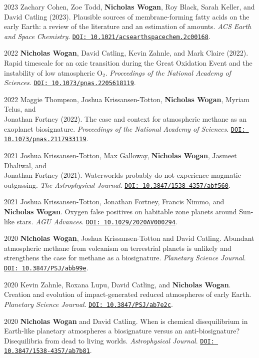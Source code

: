 \documentclass{article}
\begin{document}
\begin{cvlist}
\item[2023]
  Zachary Cohen, Zoe Todd, \textbf{Nicholas Wogan}, Roy Black, Sarah Keller, and David Catling (2023). Plausible sources of membrane-forming fatty acids on the early Earth: a review of the literature and an estimation of amounts. \emph{ACS Earth and Space Chemistry}. \href{https://doi.org/10.1021/acsearthspacechem.2c00168}{\nolinkurl{DOI: 10.1021/acsearthspacechem.2c00168}}.
\item[2022]
  \textbf{Nicholas Wogan}, David Catling, Kevin Zahnle, and Mark Claire (2022). Rapid timescale for an oxic transition during the Great Oxidation Event and the instability of low atmospheric O$_2$. \emph{Proceedings of the National Academy of Sciences}. \href{https://doi.org/10.1073/pnas.2205618119}{\nolinkurl{DOI: 10.1073/pnas.2205618119}}.
\item[2022]
  Maggie Thompson, Joshua Krissansen-Totton, \textbf{Nicholas Wogan}, Myriam Telus, and \\Jonathan Fortney (2022). The case and context for atmospheric methane as an exoplanet biosignature. \emph{Proceedings of the National Academy of Sciences}. \href{https://doi.org/10.1073/pnas.2117933119}{\nolinkurl{DOI: 10.1073/pnas.2117933119}}.
\item[2021]
  Joshua Krissansen-Totton, Max Galloway, \textbf{Nicholas Wogan}, Jasmeet Dhaliwal, and \\Jonathan Fortney (2021). Waterworlds probably do not experience magmatic outgassing. \emph{The Astrophysical Journal}. \href{https://doi.org/10.3847/1538-4357/abf560}{\nolinkurl{DOI: 10.3847/1538-4357/abf560}}.
\item[2021]
  Joshua Krissansen-Totton, Jonathan Fortney, Francis Nimmo, and \textbf{Nicholas Wogan}. Oxygen false positives on habitable zone planets around Sun-like stars. \emph{AGU Advances}. \href{https://doi.org/10.1029/2020AV000294}{\nolinkurl{DOI: 10.1029/2020AV000294}}.
\item[2020]
  \textbf{Nicholas Wogan}, Joshua Krissansen-Totton and David Catling. Abundant atmospheric methane from volcanism on terrestrial planets is unlikely and strengthens the case for methane as a biosignature. \emph{Planetary Science Journal}. \href{https://doi.org/10.3847/PSJ/abb99e}{\nolinkurl{DOI: 10.3847/PSJ/abb99e}}.
\item[2020]
  Kevin Zahnle, Roxana Lupu, David Catling, and \textbf{Nicholas Wogan}. Creation and evolution of impact-generated reduced atmospheres of early Earth. \emph{Planetary Science Journal}. \href{https://doi.org/10.3847/PSJ/ab7e2c}{\nolinkurl{DOI: 10.3847/PSJ/ab7e2c}}.
\item[2020]
  \textbf{Nicholas Wogan} and David Catling. When is chemical disequilibrium in Earth-like planetary atmospheres a biosignature versus an anti-biosignature? Disequilibria from dead to living worlds. \emph{Astrophysical Journal}. \href{https://doi.org/10.3847/1538-4357/ab7b81}{\nolinkurl{DOI: 10.3847/1538-4357/ab7b81}}.
\end{cvlist}
\end{document}
